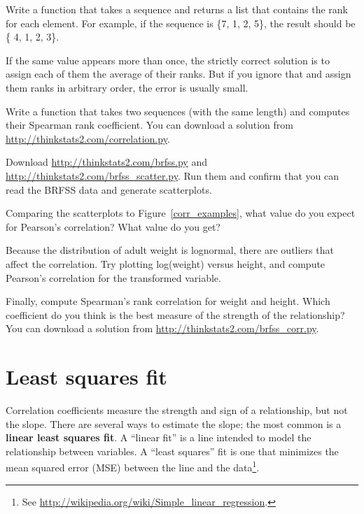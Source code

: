 \documentclass[12pt]{book}
\begin{document}
\begin{exercise}
Write a function that takes a sequence and returns a list that
contains the rank for each element.  For example, if the sequence is
\{7, 1, 2, 5\}, the result should be \{ 4, 1, 2, 3\}.

If the same value appears more than once, the strictly correct
solution is to assign each of them the average of their ranks.  But if
you ignore that and assign them ranks in arbitrary order, the error is
usually small.

Write a function that takes two sequences (with the same length) and
computes their Spearman rank coefficient.  You can download a solution
from \url{http://thinkstats2.com/correlation.py}.

\end{exercise}


\begin{exercise}
Download \url{http://thinkstats2.com/brfss.py} and
\url{http://thinkstats2.com/brfss_scatter.py}.  Run them and confirm that you
can read the BRFSS data and generate scatterplots.

Comparing the scatterplots to Figure~\ref{corr_examples}, what value
do you expect for Pearson's correlation?  What value do you get?

Because the distribution of adult weight is lognormal, there are
outliers that affect the correlation.  Try plotting
log(weight) versus height, and compute Pearson's
correlation for the transformed variable.

Finally, compute Spearman's rank correlation for weight and height.
Which coefficient do you think is the best measure of the strength of
the relationship?  You can download a solution from
\url{http://thinkstats2.com/brfss_corr.py}.

\end{exercise}


\section{Least squares fit}

Correlation coefficients measure the strength and sign of a
relationship, but not the slope.  There are several ways to estimate
the slope; the most common is a {\bf linear least squares fit}.  A
``linear fit'' is a line intended to model the relationship between
variables.  A ``least squares'' fit is one that minimizes the mean
squared error (MSE) between the line and the data\footnote{See
  \url{http://wikipedia.org/wiki/Simple_linear_regression}.}.
\end{document}
